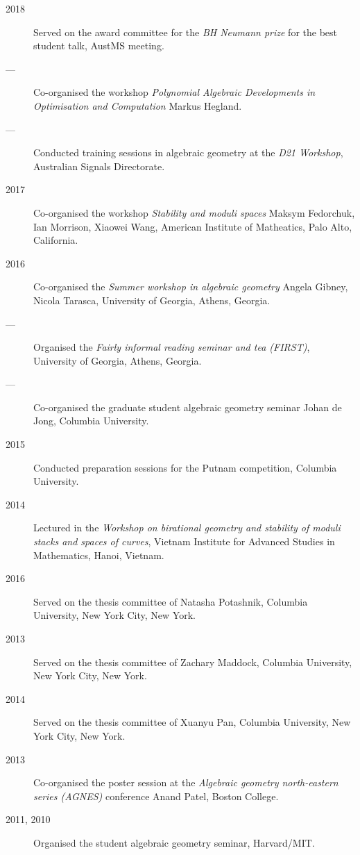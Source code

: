 \documentclass[11pt]{article}
\begin{document}
\begin{description}
\item[{2018}] Served on the award committee for the \emph{BH Neumann prize} for the best student talk, AustMS meeting.
\item[{---}] Co-organised the workshop \emph{Polynomial Algebraic Developments in Optimisation and Computation} Markus Hegland.
\item[{---}] Conducted training sessions in algebraic geometry at the \emph{D21 Workshop}, Australian Signals Directorate.
\item[{2017}] Co-organised the workshop \emph{Stability and moduli spaces} Maksym Fedorchuk, Ian Morrison, Xiaowei Wang, American Institute of Matheatics, Palo Alto, California.
\item[{2016}] Co-organised the \emph{Summer workshop in algebraic geometry} Angela Gibney, Nicola Tarasca, University of Georgia, Athens, Georgia.
\item[{---}] Organised the \emph{Fairly informal reading seminar and tea (FIRST)}, University of Georgia, Athens, Georgia.
\item[{---}] Co-organised the graduate student algebraic geometry seminar Johan de Jong, Columbia University.
\item[{2015}] Conducted preparation sessions for the Putnam competition, Columbia University.
\item[{2014}] Lectured in the \emph{Workshop on birational geometry and stability of moduli stacks and spaces of curves}, Vietnam Institute for Advanced Studies in Mathematics, Hanoi, Vietnam.
\item[{2016}] Served on the thesis committee of Natasha Potashnik, Columbia University, New York City, New York.
\item[{2013}] Served on the thesis committee of Zachary Maddock, Columbia University, New York City, New York.
\item[{2014}] Served on the thesis committee of Xuanyu Pan, Columbia University, New York City, New York.
\item[{2013}] Co-organised the poster session at the \emph{Algebraic geometry north-eastern series (AGNES)} conference Anand Patel, Boston College.
\item[{2011, 2010}] Organised the student algebraic geometry seminar, Harvard/MIT.
\end{description}
\end{document}
